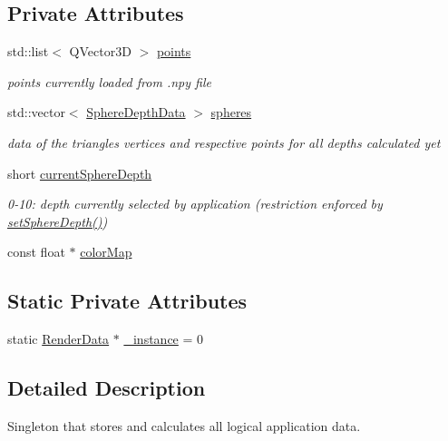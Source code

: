 \subsection*{Private Attributes}
\begin{DoxyCompactItemize}
\item 
std\+::list$<$ Q\+Vector3D $>$ \hyperlink{class_render_data_aaab890b2c9bac7bb08d5f257e98a7cb9}{points}
\begin{DoxyCompactList}\small\item\em points currently loaded from .npy file \end{DoxyCompactList}\item 
std\+::vector$<$ \hyperlink{struct_sphere_depth_data}{Sphere\+Depth\+Data} $>$ \hyperlink{class_render_data_af8d7292450ad6bba825a6dbb75be217c}{spheres}
\begin{DoxyCompactList}\small\item\em data of the triangles\textquotesingle{} vertices and respective points for all depths calculated yet \end{DoxyCompactList}\item 
short \hyperlink{class_render_data_addeb27eb3a3e9c8bf50a3615fbcc8752}{current\+Sphere\+Depth}
\begin{DoxyCompactList}\small\item\em 0-\/10\+: depth currently selected by application (restriction enforced by \hyperlink{class_render_data_a8d5f7285d29dc9ca0f93fcf2b5826283}{set\+Sphere\+Depth()}) \end{DoxyCompactList}\item 
const float $\ast$ \hyperlink{class_render_data_a78b66cb01444d2d36c3ed9179705a716}{color\+Map}
\end{DoxyCompactItemize}
\subsection*{Static Private Attributes}
\begin{DoxyCompactItemize}
\item 
static \hyperlink{class_render_data}{Render\+Data} $\ast$ \hyperlink{class_render_data_a133da67a805762c95284248a7ea1526c}{\+\_\+instance} = 0
\end{DoxyCompactItemize}


\subsection{Detailed Description}
Singleton that stores and calculates all logical application data. 

